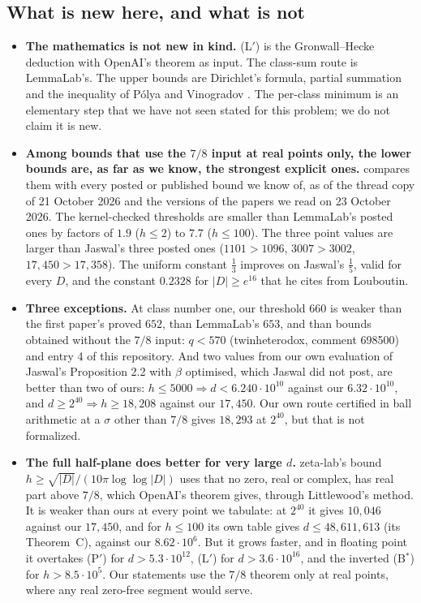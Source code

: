 \documentclass[11pt]{article}
\theoremstyle{definition}
\begin{document}
\subsection{What is new here, and what is not}\label{sec:positioning}

\begin{itemize}
\item \textbf{The mathematics is not new in kind.} (L$'$) is the Gronwall--Hecke deduction with OpenAI's theorem as input. The class-sum route is LemmaLab's. The upper bounds are Dirichlet's formula, partial summation and the inequality of Pólya and Vinogradov \cite{Dirichlet1839,Polya1918,Vinogradov1918}. The per-class minimum is an elementary step that we have not seen stated for this problem; we do not claim it is new.
\item \textbf{Among bounds that use the $7/8$ input at real points only, the lower bounds are, as far as we know, the strongest explicit ones.}  compares them with every posted or published bound we know of, as of the thread copy of 21 October 2026 and the versions of the papers we read on 23 October 2026. The kernel-checked thresholds are smaller than LemmaLab's posted ones by factors of $1.9$ ($h \le 2$) to $7.7$ ($h \le 100$). The three point values are larger than Jaswal's three posted ones ($1101 > 1096$, $3007 > 3002$, $17{,}450 > 17{,}358$). The uniform constant $\frac13$ improves on Jaswal's $\frac15$, valid for every $D$, and the constant $0.2328$ for $|D| \ge e^{16}$ that he cites from Louboutin.
\item \textbf{Three exceptions.} At class number one, our threshold $660$ is weaker than the first paper's proved $652$, than LemmaLab's $653$, and than bounds obtained without the $7/8$ input: $q < 570$ (twinheterodox, comment 698500) and entry 4 of this repository. And two values from our own evaluation of Jaswal's Proposition 2.2 with $\beta$ optimised, which Jaswal did not post, are better than two of ours: $h \le 5000 \Rightarrow d < 6.240\cdot10^{10}$ against our $6.32\cdot10^{10}$, and $d \ge 2^{40} \Rightarrow h \ge 18{,}208$ against our $17{,}450$. Our own route certified in ball arithmetic at a $\sigma$ other than $7/8$ gives $18{,}293$ at $2^{40}$, but that is not formalized.
\item \textbf{The full half-plane does better for very large $d$.} zeta-lab's bound $h \ge \sqrt{|D|}/(10\pi\log\log|D|)$ \cite{ZetaLab2026} uses that no zero, real or complex, has real part above $7/8$, which OpenAI's theorem gives, through Littlewood's method. It is weaker than ours at every point we tabulate: at $2^{40}$ it gives $10{,}046$ against our $17{,}450$, and for $h \le 100$ its own table gives $d \le 48{,}611{,}613$ (its Theorem~C), against our $8.62\cdot10^6$. But it grows faster, and in floating point it overtakes (P$'$) for $d > 5.3\cdot10^{12}$, (L$'$) for $d > 3.6\cdot10^{16}$, and the inverted (B$^*$) for $h > 8.5\cdot10^5$. Our statements use the $7/8$ theorem only at real points, where any real zero-free segment would serve.

\end{itemize}
\end{document}
